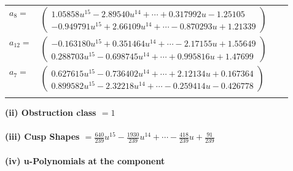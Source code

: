 \documentclass[1p]{elsarticle_modified}
\theoremstyle{definition}
\begin{document}
\begin{tabular}{m{7pt} m{180pt} m{7pt} m{180pt} }
\flushright $a_{8}=$&$\begin{pmatrix}1.05858 u^{15}-2.89540 u^{14}+\cdots+0.317992 u-1.25105\\-0.949791 u^{15}+2.66109 u^{14}+\cdots-0.870293 u+1.21339\end{pmatrix}$ \\
\flushright $a_{12}=$&$\begin{pmatrix}-0.163180 u^{15}+0.351464 u^{14}+\cdots-2.17155 u+1.55649\\0.288703 u^{15}-0.698745 u^{14}+\cdots+0.995816 u+1.47699\end{pmatrix}$ \\
\flushright $a_{7}=$&$\begin{pmatrix}0.627615 u^{15}-0.736402 u^{14}+\cdots+2.12134 u+0.167364\\0.899582 u^{15}-2.32218 u^{14}+\cdots-0.259414 u-0.426778\end{pmatrix}$\\&\end{tabular}
\flushleft \textbf{(ii) Obstruction class $= 1$}\\~\\
\flushleft \textbf{(iii) Cusp Shapes $= \frac{640}{239} u^{15}-\frac{1930}{239} u^{14}+\cdots-\frac{418}{239} u+\frac{91}{239}$}\\~\\
\newpage\renewcommand{\arraystretch}{1}
\flushleft \textbf{(iv) u-Polynomials at the component}\newline \\
\end{document}
